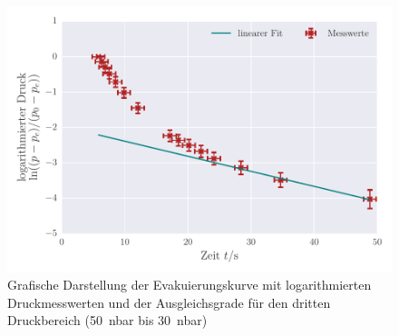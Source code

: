 \begin{figure}[!h]
 \centering
 \includegraphics[scale=0.8]{../Grafiken/Evakuierungskurve_Turbo_log_2.pdf}
 \caption{Grafische Darstellung der Evakuierungskurve mit logarithmierten Druckmesswerten und der Ausgleichsgrade für den dritten Druckbereich (\SI{50}{\nano\bar} bis \SI{30}{\nano\bar})\label{fig:evakuierungskurve_turbo_log_2}}
 \end{figure} 